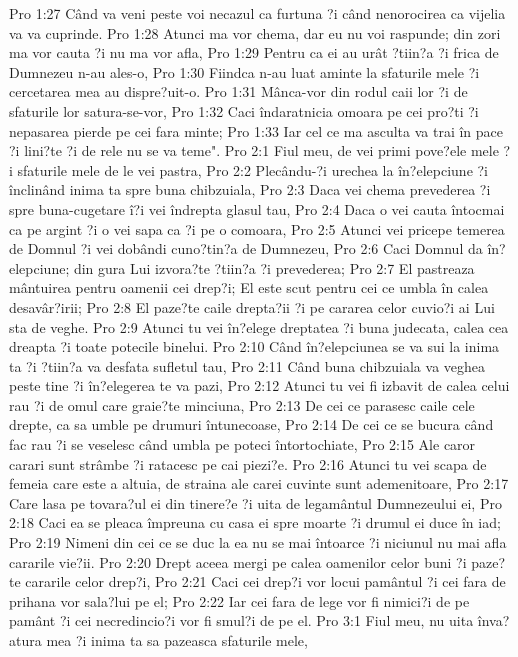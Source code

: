 Pro 1:27  Când va veni peste voi necazul ca furtuna ?i când nenorocirea ca vijelia va va cuprinde.
Pro 1:28  Atunci ma vor chema, dar eu nu voi raspunde; din zori ma vor cauta ?i nu ma vor afla,
Pro 1:29  Pentru ca ei au urât ?tiin?a ?i frica de Dumnezeu n-au ales-o,
Pro 1:30  Fiindca n-au luat aminte la sfaturile mele ?i cercetarea mea au dispre?uit-o.
Pro 1:31  Mânca-vor din rodul caii lor ?i de sfaturile lor satura-se-vor,
Pro 1:32  Caci îndaratnicia omoara pe cei pro?ti ?i nepasarea pierde pe cei fara minte;
Pro 1:33  Iar cel ce ma asculta va trai în pace ?i lini?te ?i de rele nu se va teme".
Pro 2:1  Fiul meu, de vei primi pove?ele mele ?i sfaturile mele de le vei pastra,
Pro 2:2  Plecându-?i urechea la în?elepciune ?i înclinând inima ta spre buna chibzuiala,
Pro 2:3  Daca vei chema prevederea ?i spre buna-cugetare î?i vei îndrepta glasul tau,
Pro 2:4  Daca o vei cauta întocmai ca pe argint ?i o vei sapa ca ?i pe o comoara,
Pro 2:5  Atunci vei pricepe temerea de Domnul ?i vei dobândi cuno?tin?a de Dumnezeu,
Pro 2:6  Caci Domnul da în?elepciune; din gura Lui izvora?te ?tiin?a ?i prevederea;
Pro 2:7  El pastreaza mântuirea pentru oamenii cei drep?i; El este scut pentru cei ce umbla în calea desavâr?irii;
Pro 2:8  El paze?te caile drepta?ii ?i pe cararea celor cuvio?i ai Lui sta de veghe.
Pro 2:9  Atunci tu vei în?elege dreptatea ?i buna judecata, calea cea dreapta ?i toate potecile binelui.
Pro 2:10  Când în?elepciunea se va sui la inima ta ?i ?tiin?a va desfata sufletul tau,
Pro 2:11  Când buna chibzuiala va veghea peste tine ?i în?elegerea te va pazi,
Pro 2:12  Atunci tu vei fi izbavit de calea celui rau ?i de omul care graie?te minciuna,
Pro 2:13  De cei ce parasesc caile cele drepte, ca sa umble pe drumuri întunecoase,
Pro 2:14  De cei ce se bucura când fac rau ?i se veselesc când umbla pe poteci întortochiate,
Pro 2:15  Ale caror carari sunt strâmbe ?i ratacesc pe cai piezi?e.
Pro 2:16  Atunci tu vei scapa de femeia care este a altuia, de straina ale carei cuvinte sunt ademenitoare,
Pro 2:17  Care lasa pe tovara?ul ei din tinere?e ?i uita de legamântul Dumnezeului ei,
Pro 2:18  Caci ea se pleaca împreuna cu casa ei spre moarte ?i drumul ei duce în iad;
Pro 2:19  Nimeni din cei ce se duc la ea nu se mai întoarce ?i niciunul nu mai afla cararile vie?ii.
Pro 2:20  Drept aceea mergi pe calea oamenilor celor buni ?i paze?te cararile celor drep?i,
Pro 2:21  Caci cei drep?i vor locui pamântul ?i cei fara de prihana vor sala?lui pe el;
Pro 2:22  Iar cei fara de lege vor fi nimici?i de pe pamânt ?i cei necredincio?i vor fi smul?i de pe el.
Pro 3:1  Fiul meu, nu uita înva?atura mea ?i inima ta sa pazeasca sfaturile mele,
